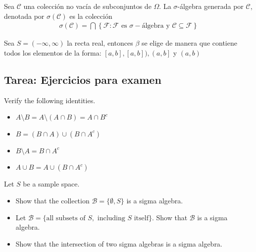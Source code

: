 \begin{Def} Sea $\mathcal{C}$ una colecci\'on no vac\'ia de subconjuntos de $\Omega$. La $\sigma$-\'algebra generada por $\mathcal{C}$, denotada por $\sigma\left(\mathcal{C}\right)$ es la colecci\'on
\begin{eqnarray*}
\sigma\left(\mathcal{C}\right)=\bigcap\left\{\mathcal{F}:\mathcal{F} \textrm{ es }\sigma-\textrm{\'algebra y }\mathcal{C}\subseteq\mathcal{F} \right\}
\end{eqnarray*}
\end{Def}

\begin{Def}
Sea $S=\left(-\infty,\infty\right)$ la recta real, entonces $\mathcal{\beta}$ se elige de manera que contiene todos los elementos de la forma: $\left[a,b\right],\left[a,b\right]),\left(a,b\right]$ y $\left(a,b\right)$
\end{Def}



\subsection{Tarea: Ejercicios para examen}

\begin{Ejer} Verify the following identities.

\begin{itemize}
\item[(a)]  $A \setminus B = A \setminus (A \cap B) = A \cap B^{c}$

\item[(b)] $B = (B \cap A) \cup (B \cap A^{c})$

\item[(c)] $B \setminus A = B \cap A^{c}$

\item[(d)] $A \cup B = A \cup (B \cap A^{c})$

\end{itemize}
\end{Ejer}

\begin{Ejer} Let $S$ be a sample space.

\begin{itemize}

\item[(a)] Show that the collection  $\mathcal{B}=\{\emptyset,S\}$ is a sigma algebra.

\item[(b)] Let $\mathcal{B} = \{\text{all subsets of } S, \text{ including } S \text{ itself}\}.$ Show that $\mathcal{B}$ is a sigma algebra.

\item[(c)] Show that the intersection of two sigma algebras is a sigma algebra.

\end{itemize}
\end{Ejer}

